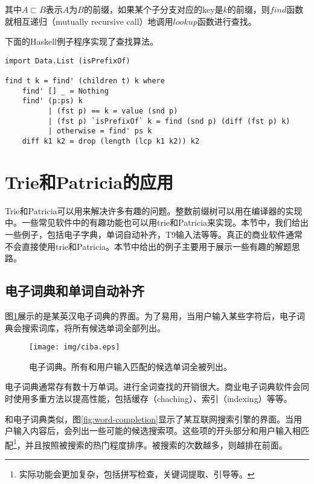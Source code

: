 \documentclass[UTF8]{article}
\begin{document}
其中$A \sqsubset B$表示$A$为$B$的前缀，如果某个子分支对应的key是$k$的前缀，则$find$函数就相互递归（mutually recursive call）地调用$lookup$函数进行查找。

下面的Haskell例子程序实现了查找算法。

\lstset{language=Haskell}
\begin{lstlisting}
import Data.List (isPrefixOf)

find t k = find' (children t) k where
    find' [] _ = Nothing
    find' (p:ps) k
          | (fst p) == k = value (snd p)
          | (fst p) `isPrefixOf` k = find (snd p) (diff (fst p) k)
          | otherwise = find' ps k
    diff k1 k2 = drop (length (lcp k1 k2)) k2
\end{lstlisting}


\section{Trie和Patricia的应用}

Trie和Patricia可以用来解决许多有趣的问题。整数前缀树可以用在编译器的实现中。一些常见软件中的有趣功能也可以用trie和Patricia来实现。本节中，我们给出一些例子，包括电子字典，单词自动补齐，T9输入法等等。真正的商业软件通常不会直接使用trie和Patricia。本节中给出的例子主要用于展示一些有趣的解题思路。

\subsection{电子词典和单词自动补齐}
图\ref{fig:e-dict}展示的是某英汉电子词典的界面。为了易用，当用户输入某些字符后，电子词典会搜索词库，将所有候选单词全部列出。

\begin{figure}[htbp]
  \centering
  \texttt{[image: img/ciba.eps]}
  \caption{电子词典。所有和用户输入匹配的候选单词全被列出。}
  \label{fig:e-dict}
\end{figure}

电子词典通常存有数十万单词。进行全词查找的开销很大。商业电子词典软件会同时使用多重方法以提高性能，包括缓存（chaching）、索引（indexing）等等。

和电子词典类似，图\ref{fig:word-completion}显示了某互联网搜索引擎的界面。当用户输入内容后，会列出一些可能的候选搜索项。这些项的开头部分和用户输入相匹配\footnote{实际功能会更加复杂，包括拼写检查，关键词提取、引导等。}，并且按照被搜索的热门程度排序。被搜索的次数越多，则越排在前面。
\end{document}
